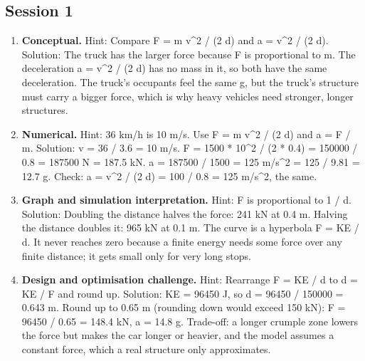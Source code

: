 \documentclass[11pt,a4paper]{article}
\begin{document}
\subsection*{Session 1}
\begin{enumerate}[nosep]
\item \textbf{Conceptual.} Hint: Compare F = m v\textasciicircum{}2 / (2 d) and a = v\textasciicircum{}2 / (2 d). Solution: The truck has the larger force because F is proportional to m. The deceleration a = v\textasciicircum{}2 / (2 d) has no mass in it, so both have the same deceleration. The truck's occupants feel the same g, but the truck's structure must carry a bigger force, which is why heavy vehicles need stronger, longer structures.
\item \textbf{Numerical.} Hint: 36 km/h is 10 m/s. Use F = m v\textasciicircum{}2 / (2 d) and a = F / m. Solution: v = 36 / 3.6 = 10 m/s. F = 1500 * 10\textasciicircum{}2 / (2 * 0.4) = 150000 / 0.8 = 187500 N = 187.5 kN. a = 187500 / 1500 = 125 m/s\textasciicircum{}2 = 125 / 9.81 = 12.7 g. Check: a = v\textasciicircum{}2 / (2 d) = 100 / 0.8 = 125 m/s\textasciicircum{}2, the same.
\item \textbf{Graph and simulation interpretation.} Hint: F is proportional to 1 / d. Solution: Doubling the distance halves the force: 241 kN at 0.4 m. Halving the distance doubles it: 965 kN at 0.1 m. The curve is a hyperbola F = KE / d. It never reaches zero because a finite energy needs some force over any finite distance; it gets small only for very long stops.
\item \textbf{Design and optimisation challenge.} Hint: Rearrange F = KE / d to d = KE / F and round up. Solution: KE = 96450 J, so d = 96450 / 150000 = 0.643 m. Round up to 0.65 m (rounding down would exceed 150 kN): F = 96450 / 0.65 = 148.4 kN, a = 14.8 g. Trade-off: a longer crumple zone lowers the force but makes the car longer or heavier, and the model assumes a constant force, which a real structure only approximates.
\end{enumerate}
\end{document}
